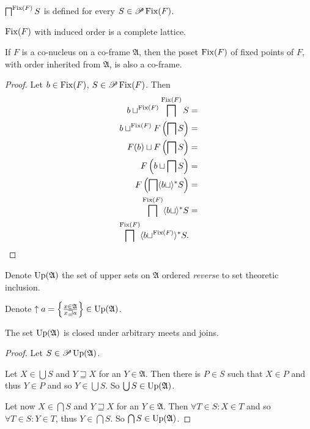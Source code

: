 \begin{cor}
$\bigsqcap^{\operatorname{Fix}(F)}S$ is defined for every $S\in\mathscr{P}\operatorname{Fix}(F)$.\end{cor}
\begin{obvious}
$\operatorname{Fix}(F)$ with induced order is a complete lattice.\end{obvious}
\begin{lem}
\label{fix-is-co-frame}If $F$ is a co-nucleus on a co-frame $\mathfrak{A}$,
then the poset $\operatorname{Fix}(F)$ of fixed points of $F$, with order inherited
from $\mathfrak{A}$, is also a co-frame.\end{lem}
\begin{proof}
Let $b\in\operatorname{Fix}(F)$, $S\in\mathscr{P}\operatorname{Fix}(F)$. Then 
\begin{align*}
b\sqcup^{\operatorname{Fix}(F)}\bigsqcap^{\operatorname{Fix}(F)}S & =\\
b\sqcup^{\operatorname{Fix}(F)}F\left(\bigsqcap S\right) & =\\
F(b)\sqcup F\left(\bigsqcap S\right) & =\\
F\left(b\sqcup\bigsqcap S\right) & =\\
F\left(\bigsqcap\langle b\sqcup\rangle^{\ast}S\right) & =\\
\bigsqcap^{\operatorname{Fix}(F)}\langle b\sqcup\rangle^{\ast}S & =\\
\bigsqcap^{\operatorname{Fix}(F)}\langle b\sqcup^{\operatorname{Fix}(F)}\rangle^{\ast}S.
\end{align*}
\end{proof}
\begin{defn}
Denote $\operatorname{Up}(\mathfrak{A})$ the set of upper sets on $\mathfrak{A}$
ordered \emph{reverse} to set theoretic inclusion.\end{defn}
\begin{defn}
Denote $\uparrow a = \left\{ \frac{x\in\mathfrak{A}}{x\sqsupseteq a}\right\} \in \operatorname{Up}(\mathfrak{A})$.
\end{defn}
\begin{lem}
The set $\operatorname{Up}(\mathfrak{A})$ is closed under arbitrary meets and
joins.\end{lem}
\begin{proof}
Let $S\in\mathscr{P}\operatorname{Up}(\mathfrak{A})$.

Let $X\in\bigcup S$ and $Y\sqsupseteq X$ for an $Y\in\mathfrak{A}$.
Then there is $P\in S$ such that $X\in P$ and thus $Y\in P$ and
so $Y\in\bigcup S$. So $\bigcup S\in\operatorname{Up}(\mathfrak{A})$.

Let now $X\in\bigcap S$ and $Y\sqsupseteq X$ for an $Y\in\mathfrak{A}$.
Then $\forall T\in S:X\in T$ and so $\forall T\in S:Y\in T$, thus
$Y\in\bigcap S$. So $\bigcap S\in\operatorname{Up}(\mathfrak{A})$.\end{proof}
